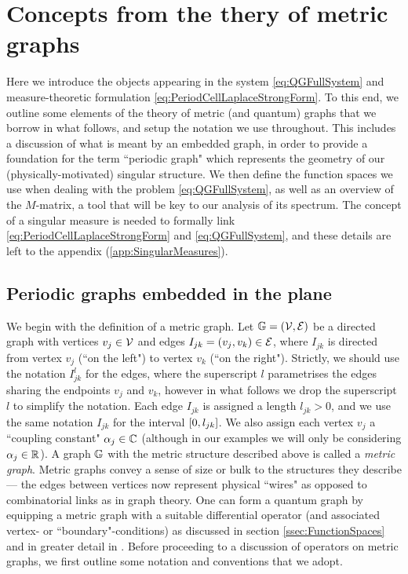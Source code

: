 \section{Concepts from the thery of metric graphs} \label{sec:QuantumGraphs}
Here we introduce the objects appearing in the system \eqref{eq:QGFullSystem} and measure-theoretic formulation \eqref{eq:PeriodCellLaplaceStrongForm}.
To this end, we outline some elements of the theory of metric (and quantum) graphs that we borrow in what follows, and setup the notation we use throughout.
This includes a discussion of what is meant by an embedded graph, in order to provide a foundation for the term ``periodic graph" which represents the geometry of our (physically-motivated) singular structure.
We then define the function spaces we use when dealing with the problem \eqref{eq:QGFullSystem}, as well as an overview of the $M$-matrix, a tool that will be key to our analysis of its spectrum.
The concept of a singular measure is needed to formally link \eqref{eq:PeriodCellLaplaceStrongForm} and \eqref{eq:QGFullSystem}, and these details are left to the appendix (\ref{app:SingularMeasures}).

\subsection{Periodic graphs embedded in the plane} \label{ssec:EmbeddedGraphs}
We begin with the definition of a metric graph.
Let $\mathbb{G}=\left( \mathcal{V},\mathcal{E} \right)$ be a directed graph with vertices $v_j\in \mathcal{V}$ and edges $I_{jk}=\left( v_j, v_k \right)\in \mathcal{E}$, where $I_{jk}$ is directed from vertex $v_j$ (``on the left") to vertex $v_k$ (``on the right").
Strictly, we should use the notation $I_{jk}^l$ for the edges, where the superscript $l$ parametrises the edges sharing the endpoints $v_j$ and $v_k$, however in what follows we drop the superscript $l$ to simplify the notation.
Each edge $I_{jk}$ is assigned a length $l_{jk}>0$, and we use the same notation $I_{jk}$ for the interval $\left[ 0,l_{jk} \right]$.
We also assign each vertex $v_j$ a ``coupling constant" $\alpha_j\in\mathbb{C}$ (although in our examples we will only be considering $\alpha_j\in\mathbb{R}$).
A graph $\mathbb{G}$ with the metric structure described above is called a \emph{metric graph}.
Metric graphs convey a sense of size or bulk to the structures they describe --- the edges between vertices now represent physical ``wires" as opposed to combinatorial links as in graph theory.
One can form a quantum graph by equipping a metric graph with a suitable differential operator (and associated vertex- or ``boundary"-conditions) as discussed in section \ref{ssec:FunctionSpaces} and in greater detail in \cite{berkolaiko2013introduction}.
Before proceeding to a discussion of operators on metric graphs, we first outline some notation and conventions that we adopt.


